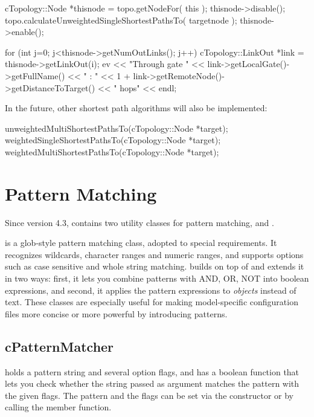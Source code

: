 \begin{cpp}
cTopology::Node *thisnode = topo.getNodeFor( this );
thisnode->disable();
topo.calculateUnweightedSingleShortestPathsTo( targetnode );
thisnode->enable();

for (int j=0; j<thisnode->getNumOutLinks(); j++)
{
  cTopology::LinkOut *link = thisnode->getLinkOut(i);
  ev << "Through gate " << link->getLocalGate()->getFullName() << " : "
     << 1 + link->getRemoteNode()->getDistanceToTarget() << " hops" << endl;
}
\end{cpp}

In the future, other shortest path algorithms will also be implemented:

\begin{cpp}
unweightedMultiShortestPathsTo(cTopology::Node *target);
weightedSingleShortestPathsTo(cTopology::Node *target);
weightedMultiShortestPathsTo(cTopology::Node *target);
\end{cpp}



\section{Pattern Matching}

Since version 4.3, {\opp} contains two utility classes for pattern
matching,  and .

 is a glob-style pattern matching class, adopted to
special {\opp} requirements. It recognizes wildcards, character ranges and
numeric ranges, and supports options such as case sensitive and whole
string matching.  builds on top of
 and extends it in two ways: first, it lets you
combine patterns with AND, OR, NOT into boolean expressions, and second, it
applies the pattern expressions to \textit{objects} instead of text. These
classes are especially useful for making model-specific configuration files
more concise or more powerful by introducing patterns.



\subsection{cPatternMatcher}

 holds a pattern string and several option flags, and has
a boolean  function that lets you check whether the string passed as argument
matches the pattern with the given flags. The pattern and the flags can be set
via the constructor or by calling the  member function.

